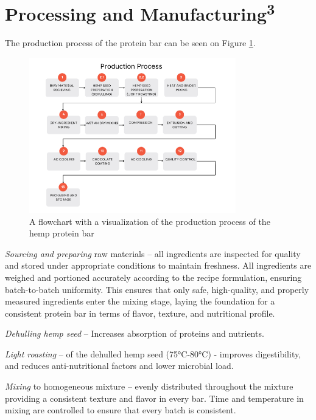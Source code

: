 \section{Processing and Manufacturing\textsuperscript{3}}
The production process of the protein bar can be seen on Figure \ref*{fig:figure_07}.
\begin{figure}
    \centering
    \includegraphics[width=0.8\textwidth]{Figures/fig_process_01.png}
    \caption{A flowchart with a visualization of the production process of the hemp protein bar}
    \label{fig:figure_07}
\end{figure}

\textit{Sourcing and preparing} raw materials – all ingredients are inspected for quality and stored under appropriate conditions to maintain freshness. All ingredients are weighed and portioned accurately according to the recipe formulation, ensuring batch-to-batch uniformity. This ensures that only safe, high-quality, and properly measured ingredients enter the mixing stage, laying the foundation for a consistent protein bar in terms of flavor, texture, and nutritional profile.

\vspace{1em}
\textit{Dehulling hemp seed} – Increases absorption of proteins and nutrients.

\vspace{1em}
\textit{Light roasting} – of the dehulled hemp seed (75°C-80°C) - improves digestibility, and reduces anti-nutritional factors and lower microbial load.

\vspace{1em}
\textit{Mixing} to homogeneous mixture – evenly distributed throughout the mixture providing a consistent texture and flavor in every bar. Time and temperature in mixing are controlled to ensure that every batch is consistent.


